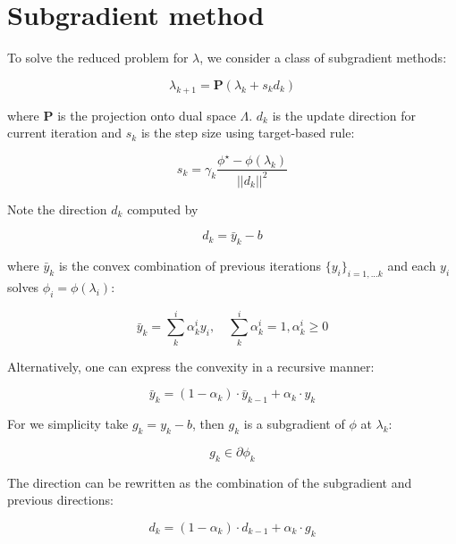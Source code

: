 \documentclass[../main]{subfiles}
\begin{document}
\section{Subgradient method}\label{subgradient-method}

To solve the reduced problem for $\lambda$, we consider a class of subgradient
methods:

\begin{equation}\lambda_{k+1} = \mathbf{P}(\lambda_{k} + s_{k}d_{k})\end{equation}

where \(\mathbf P\) is the projection onto dual space \(\Lambda\).
\(d_k\) is the update direction for current iteration and \(s_{k}\) is
the step size using target-based rule:

\begin{equation}\label{eq:step_size}
  s_{k} = \gamma_k\frac{\phi^\star - \phi(\lambda_k)}{||d_{k}||^2}
\end{equation}

Note the direction \(d_k\) computed by

\begin{equation}\label{eq:direction}
  d_k = \bar y_k - b
\end{equation}

where \(\bar y_k\) is the convex combination of previous iterations
\(\{y_i\}_{i=1,...k}\) and each \(y_i\) solves
\(\phi_i = \phi(\lambda_i)\):

\begin{equation}\bar y_k = \sum^i_k \alpha^i_k y_i,\quad  \sum^i_k \alpha^i_k = 1, \alpha^i_k \ge 0\end{equation}

Alternatively, one can express the convexity in a recursive manner:

\begin{equation}\bar y_k = (1-\alpha_k)\cdot\bar y_{k-1} + \alpha_k \cdot y_k \end{equation}

For we simplicity take \(g_k= y_k - b\), then \(g_k\) is a subgradient
of \(\phi\) at \(\lambda_k\):

\begin{equation}g_k \in \partial \phi_k\end{equation}

The direction can be rewritten as the combination of the subgradient and
previous directions:

\begin{equation}\label{eq:direction_recursive}
  d_k = (1-\alpha_k) \cdot d_{k-1} + \alpha_k\cdot g_k
\end{equation}
\end{document}
